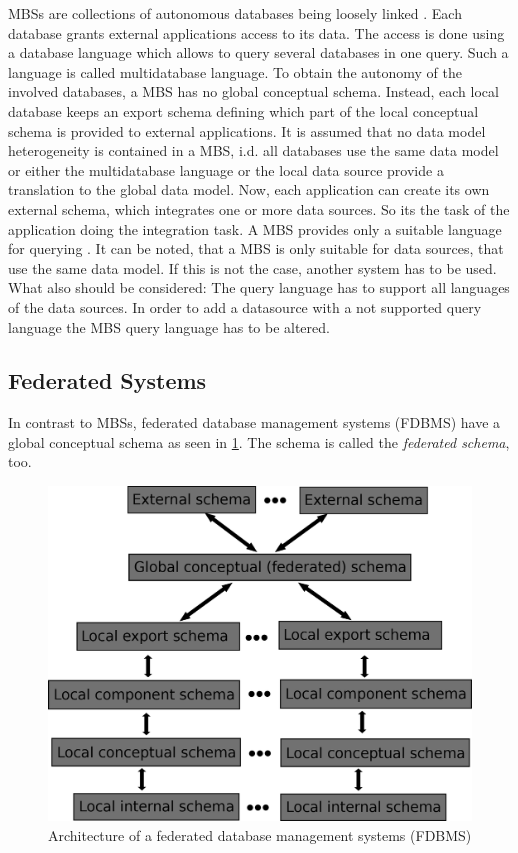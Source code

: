 MBSs are collections of autonomous databases being loosely linked \cite[p. 93]{DBLP:books/dp/LeserN2006}. Each database grants external applications access to its data. The access is done using a database language which allows to query several databases in one query. Such a language is called multidatabase language. To obtain the autonomy  of the involved databases, a MBS has no global conceptual schema. Instead, each local database keeps an export schema defining which part of the local conceptual schema is provided to external applications.  
It is assumed that no data model heterogeneity is contained in a MBS, i.d. all databases use the same data model or either the multidatabase language or the local data source provide a translation to the global data model. Now, each application can create its own external schema, which integrates one or more data sources. So its the task of the application doing the integration task. A MBS provides only a suitable language for querying \cite[p. 94]{DBLP:books/dp/LeserN2006}.	
It can be noted, that a MBS is only suitable for data sources, that use the same data model. If this is not the case, another system has to be used. What also should be considered: The query language has to support all languages of the data sources. In order to add a datasource with a not supported query language the MBS query language has to be altered. 

\subsection{Federated Systems}

In contrast to MBSs, federated database management systems (FDBMS) have a global conceptual schema as seen in \ref{FDBMSArchitecture}. The schema is called the \emph{federated schema}, too.

\begin{figure}[H]
	\begin{center}
		\includegraphics[scale=0.5]{figures/federatedDatabaseArchitecture.png}
	\end{center}
	\caption{Architecture of a  federated database management systems (FDBMS) \cite[p. 95]{DBLP:books/dp/LeserN2006}}
	\label{FDBMSArchitecture}
\end{figure}

